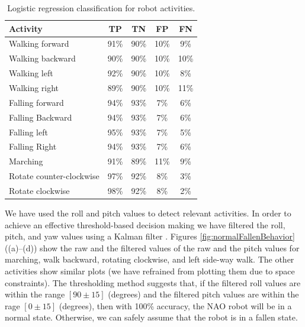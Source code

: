 \documentclass[letterpaper]{article}
\begin{document}
\begin{sloppy}
\begin{table}[!ht]
\caption{Logistic regression classification for robot activities.}
	\label{tab:robot-logistic-class}
	\centering
		\begin{tabular} {| l | c | c | c| c|}
		\hline
			{\bf Activity} & {\bf  TP}  &	{\bf TN}  &	{\bf FP} &	{\bf FN} \\ 
\hline
			Walking forward	& 91\%	& 90\%	& 10\%	& 9\% \\ \hline
			Walking backward	& 90\%	& 90\%	& 10\%	& 10\% \\ \hline
			Walking left 	& 92\%	& 90\%	& 10\%	& 8\% \\ \hline
			Walking right 	& 89\%	& 90\%	& 10\%	& 11\% \\ \hline
			Falling forward	& 94\%	& 93\%	& 7\%	& 6\%	 \\ \hline
			Falling Backward	& 94\%	& 93\%	& 7\%	& 6\%	 \\ \hline
			Falling left	& 95\%	& 93\%	& 7\%	& 5\%	 \\ \hline
			Falling Right	& 94\%	& 93\%	& 7\%	& 6\%	 \\ \hline
			Marching	& 91\%	& 89\%	& 11\%	& 9\%	 \\ \hline
			Rotate counter-clockwise	& 97\%	& 92\%	& 8\%	& 3\%	 \\ \hline
			Rotate clockwise	& 98\%	& 92\%	& 8\%	& 2\%	 \\ \hline
		\end{tabular}
\end{table}

We have used the roll and pitch values to detect relevant activities. In order to achieve 
an effective threshold-based decision making we have filtered the roll, pitch, and
yaw values using a Kalman filter \cite{Welch:1995:IKF:897831}. Figures 
\ref{fig:normalFallenBehavior} ((a)--(d)) show
the raw and the filtered values of the raw and the pitch values for marching, walk backward,
rotating clockwise, and left side-way walk. The other activities show similar plots (we have 
refrained from plotting them due to space constraints). The thresholding method
suggests that, if the filtered roll values are within the range $[90\pm15]$ (degrees) and the
filtered pitch values are within the rage $[0\pm15]$ (degrees), then with 100\% accuracy, the NAO 
 robot will be in a normal state. Otherwise, we can safely assume that the robot is in 
a fallen state.   


\end{sloppy}
\end{document}
